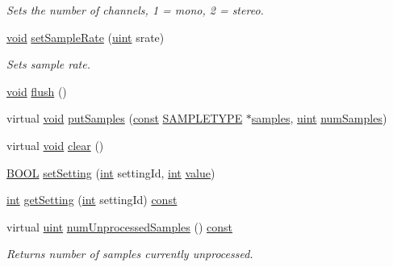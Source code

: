 \begin{DoxyCompactItemize}
\begin{DoxyCompactList}\small\item\em Sets the number of channels, 1 = mono, 2 = stereo. \end{DoxyCompactList}\item 
\hyperlink{sound_8c_ae35f5844602719cf66324f4de2a658b3}{void} \hyperlink{classsoundtouch_1_1_sound_touch_a1dedb0c46da8c83aab8afa86c1af65d8}{set\+Sample\+Rate} (\hyperlink{_s_t_types_8h_a91ad9478d81a7aaf2593e8d9c3d06a14}{uint} srate)
\begin{DoxyCompactList}\small\item\em Sets sample rate. \end{DoxyCompactList}\item 
\hyperlink{sound_8c_ae35f5844602719cf66324f4de2a658b3}{void} \hyperlink{classsoundtouch_1_1_sound_touch_a0a958af18bea7332a265456ebced82dc}{flush} ()
\item 
virtual \hyperlink{sound_8c_ae35f5844602719cf66324f4de2a658b3}{void} \hyperlink{classsoundtouch_1_1_sound_touch_ab0fd44e318c01a27270dd7d45ff98ed2}{put\+Samples} (\hyperlink{getopt1_8c_a2c212835823e3c54a8ab6d95c652660e}{const} \hyperlink{namespacesoundtouch_a97cfd29a7abb4d4b2a72f803d5b5850c}{S\+A\+M\+P\+L\+E\+T\+Y\+PE} $\ast$\hyperlink{test__w__saw8_8c_a54185623a5a093f671a73e5fba6197a1}{samples}, \hyperlink{_s_t_types_8h_a91ad9478d81a7aaf2593e8d9c3d06a14}{uint} \hyperlink{classsoundtouch_1_1_f_i_f_o_processor_a254a8506a4a93083c0e914aff361c674}{num\+Samples})
\item 
virtual \hyperlink{sound_8c_ae35f5844602719cf66324f4de2a658b3}{void} \hyperlink{classsoundtouch_1_1_sound_touch_aac5e149a9ed248c6ce680422909032af}{clear} ()
\item 
\hyperlink{nfilterkit_8h_a3be13892ae7076009afcf121347dd319}{B\+O\+OL} \hyperlink{classsoundtouch_1_1_sound_touch_ab68a03949c4d62895f5a950080a80cd7}{set\+Setting} (\hyperlink{xmltok_8h_a5a0d4a5641ce434f1d23533f2b2e6653}{int} setting\+Id, \hyperlink{xmltok_8h_a5a0d4a5641ce434f1d23533f2b2e6653}{int} \hyperlink{lib_2expat_8h_a4a30a13b813682e68c5b689b45c65971}{value})
\item 
\hyperlink{xmltok_8h_a5a0d4a5641ce434f1d23533f2b2e6653}{int} \hyperlink{classsoundtouch_1_1_sound_touch_aab8218d51b66842d5173b197954c69d9}{get\+Setting} (\hyperlink{xmltok_8h_a5a0d4a5641ce434f1d23533f2b2e6653}{int} setting\+Id) \hyperlink{getopt1_8c_a2c212835823e3c54a8ab6d95c652660e}{const} 
\item 
virtual \hyperlink{_s_t_types_8h_a91ad9478d81a7aaf2593e8d9c3d06a14}{uint} \hyperlink{classsoundtouch_1_1_sound_touch_a6cbed9e02a12d4eb501a98b7e1ed51fa}{num\+Unprocessed\+Samples} () \hyperlink{getopt1_8c_a2c212835823e3c54a8ab6d95c652660e}{const} 
\begin{DoxyCompactList}\small\item\em Returns number of samples currently unprocessed. \end{DoxyCompactList}\end{DoxyCompactItemize}
